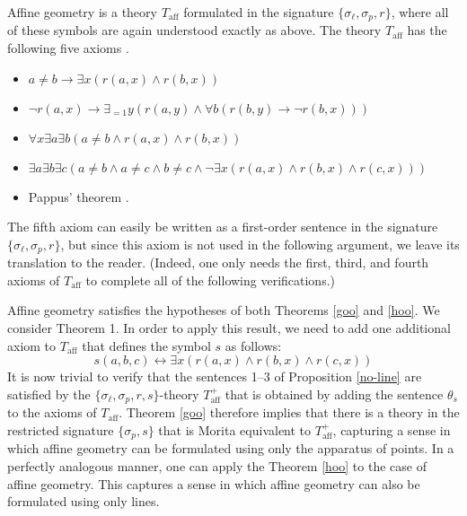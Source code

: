 \begin{example}
  Affine geometry is a theory $T_\text{aff}$ formulated in the
  signature $\{\sigma_\ell, \sigma_p, r\}$, where all of these symbols
  are again understood exactly as above. The theory $T_\text{aff}$ has
  the following five axioms \cite[p.~118]{veblen1918}.
\begin{itemize}
\item $a\neq b\rightarrow \exists x (r(a,x)\land r(b,x))$
\item $\lnot r(a,x)\rightarrow \exists_{=1} y(r(a,y)\land\forall b(r(b,y)\rightarrow\lnot r(b,x)))$
\item $\forall x\exists a\exists b(a\neq b\land r(a,x)\land r(b,x))$
\item $\exists a\exists b\exists c(a\neq b\land a\neq c\land b\neq c\land \lnot \exists x(r(a,x)\land r(b,x)\land r(c,x)))$
\item Pappus' theorem \cite[p.~103 and Figure 40]{veblen1918}.
\end{itemize}
The fifth axiom can easily be written as a first-order sentence in the
signature $\{\sigma_\ell, \sigma_p, r\}$, but since this axiom is not
used in the following argument, we leave its translation to the
reader. (Indeed, one only needs the first, third, and fourth axioms of
$T_\text{aff}$ to complete all of the following verifications.)

Affine geometry satisfies the hypotheses of both Theorems \ref{goo}
and \ref{hoo}. We consider Theorem 1. In order to apply this result,
we need to add one additional axiom to $T_\text{aff}$ that defines the
symbol $s$ as follows:
\begin{equation}
\tag{$\theta_s$}
s(a,b,c)\leftrightarrow \exists x(r(a,x)\land r(b, x)\land r(c, x))
\end{equation}
It is now trivial to verify that the sentences 1--3 of Proposition
\ref{no-line} are satisfied by the
$\{\sigma_\ell, \sigma_p, r, s\}$-theory $T_\text{aff}^+$ that is
obtained by adding the sentence $\theta_s$ to the axioms of
$T_\text{aff}$. Theorem \ref{goo} therefore implies that there is a
theory in the restricted signature $\{\sigma_p, s\}$ that is Morita
equivalent to $T_\text{aff}^+$, capturing a sense in which affine
geometry can be formulated using only the apparatus of points. In a
perfectly analogous manner, one can apply the Theorem \ref{hoo} to the
case of affine geometry. This captures a sense in which affine
geometry can also be formulated using only lines.
\end{example}

